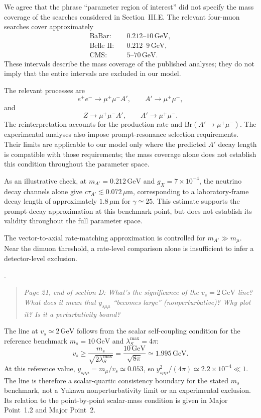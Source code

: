 \documentclass[12pt,a4paper]{article}
\begin{document}
We agree that the phrase ``parameter region of interest'' did not specify the mass coverage of the searches considered in Section~III.E. The relevant four-muon searches cover approximately
\[
\begin{aligned}
\text{BaBar}:&\quad 0.212\text{--}10\,\mathrm{GeV},\\
\text{Belle II}:&\quad 0.212\text{--}9\,\mathrm{GeV},\\
\text{CMS}:&\quad 5\text{--}70\,\mathrm{GeV}.
\end{aligned}
\]
These intervals describe the mass coverage of the published analyses; they do not imply that the entire intervals are excluded in our model.

The relevant processes are
\[
e^+e^-\to\mu^+\mu^-A',
\qquad A'\to\mu^+\mu^-,
\]
and
\[
Z\to\mu^+\mu^-A',
\qquad A'\to\mu^+\mu^-.
\]
The reinterpretation accounts for the production rate and \(\mathrm{Br}(A'\to\mu^+\mu^-)\). The experimental analyses also impose prompt-resonance selection requirements. Their limits are applicable to our model only where the predicted \(A'\) decay length is compatible with those requirements; the mass coverage alone does not establish this condition throughout the parameter space.

As an illustrative check, at \(m_{A'}=0.212\,\mathrm{GeV}\) and \(g_X=7\times10^{-4}\), the neutrino decay channels alone give \(c\tau_{A'}\lesssim0.072\,\mu\mathrm{m}\), corresponding to a laboratory-frame decay length of approximately \(1.8\,\mu\mathrm{m}\) for \(\gamma\simeq25\). This estimate supports the prompt-decay approximation at this benchmark point, but does not establish its validity throughout the full parameter space.

The vector-to-axial rate-matching approximation is controlled for \(m_{A'}\gg m_\mu\). Near the dimuon threshold, a rate-level comparison alone is insufficient to infer a detector-level exclusion.

\medskip
{}. \begin{quote}\itshape
Page 21, end of section D: What's the significance of the \(v_s=2\,\mathrm{GeV}\) line? What does it mean that \(y_{s\mu\mu}\) ``becomes large'' (nonperturbative)? Why plot it? Is it a perturbativity bound?
\end{quote}

The line at \(v_s\simeq2\,\mathrm{GeV}\) follows from the scalar self-coupling condition for the reference benchmark \(m_s=10\,\mathrm{GeV}\) and \(\lambda_S^{\max}=4\pi\):
\[
v_s\geq\frac{m_s}{\sqrt{2\lambda_S^{\max}}}
=\frac{10\,\mathrm{GeV}}{\sqrt{8\pi}}
\simeq1.995\,\mathrm{GeV}.
\]
At this reference value, \(y_{s\mu\mu}=m_\mu/v_s\simeq0.053\), so \(y_{s\mu\mu}^2/(4\pi)\simeq2.2\times10^{-4}\ll1\). The line is therefore a scalar-quartic consistency boundary for the stated \(m_s\) benchmark, not a Yukawa nonperturbativity limit or an experimental exclusion. Its relation to the point-by-point scalar-mass condition is given in Major Point~1.2 and Major Point~2.
\end{document}
